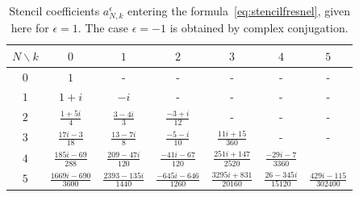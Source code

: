 \documentclass[aps,showpacs,twocolumn,
prd,superscriptaddress,nofootinbib]{revtex4-1}
\begin{document}
\begin{table}[t]
\begin{ruledtabular}\caption{Stencil coefficients $a_{N,k}^{\epsilon}$ entering the formula~\eqref{eq:stencilfresnel}, given here for $\epsilon=1$. The case $\epsilon=-1$ is obtained by complex conjugation.}\label{tab:stencil}
\begin{tabular}{c|cccccc}
	$N \backslash k$ & $0$ & $1$ & $2$ & $3$ & $4$ & $5$ \\
	\hline
	$0$ & $1$ & - & - & - & - & - \\
	$1$ & $1+i$ & $-i$ & - & - & - & - \\
	$2$ & $\frac{1+5i}{4}$ & $\frac{3-4i}{3}$ & $\frac{-3+i}{12}$ & - & - & - \\
	$3$ & $\frac{17 i-3}{18}$ & $\frac{13-7 i}{8}$ & $\frac{-5-i}{10}$ & $\frac{11 i+15}{360}$ & - & - \\
	$4$ & $\frac{185 i-69}{288}$ & $\frac{209-47 i}{120}$ & $\frac{-41 i-67}{120}$ & $\frac{251 i+147}{2520}$ & $\frac{-29 i-7}{3360}$ & \\
	$5$ & $\frac{1669 i-690}{3600}$ & $\frac{2393-135 i}{1440}$ & $\frac{-645 i-646}{1260}$ & $\frac{3295 i+831}{20160}$ & $\frac{26-345 i}{15120}$ & $\frac{429 i-115}{302400}$ \\
\end{tabular}
\end{ruledtabular}
\end{table}
\end{document}
